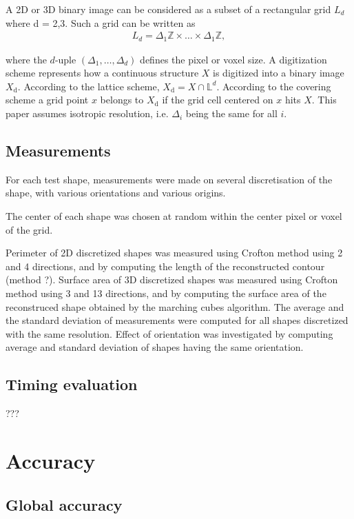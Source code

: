 \documentclass{InsightArticle}
\begin{document}
A 2D or 3D binary image can be considered as a subset of a rectangular grid $L_d$ where
d = 2,3. Such a grid can be written as
\begin{eqnarray}
L_d = \Delta_{1} \mathbb{Z} \times \ldots \times \Delta_{1} \mathbb{Z},
\end{eqnarray}

where the $d$-uple $(\Delta_{1},\ldots,\Delta_{d})$ defines the pixel
or voxel size. A digitization scheme represents how a continuous
structure $X$ is digitized into a binary image $X_\text{d}$. According to
the lattice scheme, $X_\text{d} = X\cap\mathbb{L}^d$. According to the
covering scheme a grid point $x$ belongs to $X_\text{d}$ if the grid
cell centered on $x$ hits $X$. 
This paper assumes isotropic resolution, i.e. $\Delta_{i}$ being the same for all $i$.

\subsection{Measurements}

For each test shape, measurements were made on
several discretisation of the shape, with various orientations and various origins.

The center of each shape was chosen at random within the center pixel or voxel of the grid.

Perimeter of 2D discretized shapes was measured using Crofton method using 2 and 4 directions, 
and by computing the length of the reconstructed contour (method ?).
Surface area of 3D discretized shapes was measured using Crofton method using 3 and 13 directions, 
and by computing the surface area of the reconstruced shape obtained by the marching cubes algorithm.
The average and the standard deviation of measurements were computed for all shapes discretized
with the same resolution. Effect of orientation was investigated by computing average and standard 
deviation of shapes having the same orientation.

\subsection{Timing evaluation}

???

\section{Accuracy}

\subsection{Global accuracy}
\end{document}
